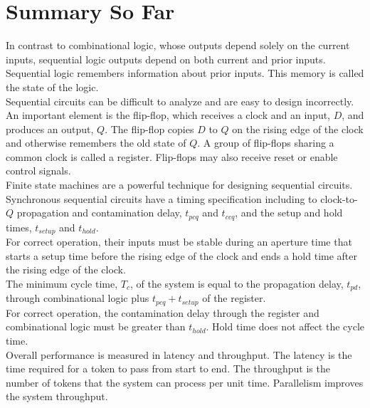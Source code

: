 \documentclass[12pt]{article}
\theoremstyle{definition}
\begin{document}
  \section{Summary So Far}
  In contrast to combinational logic, whose outputs depend solely on the current inputs, sequential logic outputs depend on both current and prior inputs.
  Sequential logic remembers information about prior inputs.
  This memory is called the state of the logic. \\

  Sequential circuits can be difficult to analyze and are easy to design incorrectly.
  An important element is the flip-flop, which receives a clock and an input, $D$, and produces an output, $Q$.
  The flip-flop copies $D$ to $Q$ on the rising edge of the clock and otherwise remembers the old state of $Q$.
  A group of flip-flops sharing a common clock is called a register.
  Flip-flops may also receive reset or enable control signals. \\

  Finite state machines are a powerful technique for designing sequential circuits. \\

  Synchronous sequential circuits have a timing specification including to clock-to-$Q$ propagation and contamination delay, $t_{pcq}$ and $t_{ccq}$, and the setup and hold times, $t_{setup}$ and $t_{hold}$. \\
  For correct operation, their inputs must be stable during an aperture time that starts a setup time before the rising edge of the clock and ends a hold time after the rising edge of the clock. \\

  The minimum cycle time, $T_{c}$, of the system is equal to the propagation delay, $t_{pd}$, through combinational logic plus $t_{pcq} + t_{setup}$ of the register. \\
  For correct operation, the contamination delay through the register and combinational logic must be greater than $t_{hold}$.
  Hold time does not affect the cycle time. \\

  Overall performance is measured in latency and throughput.
  The latency is the time required for a token to pass from start to end.
  The throughput is the number of tokens that the system can process per unit time.
  Parallelism improves the system throughput.

  \newpage
\end{document}
